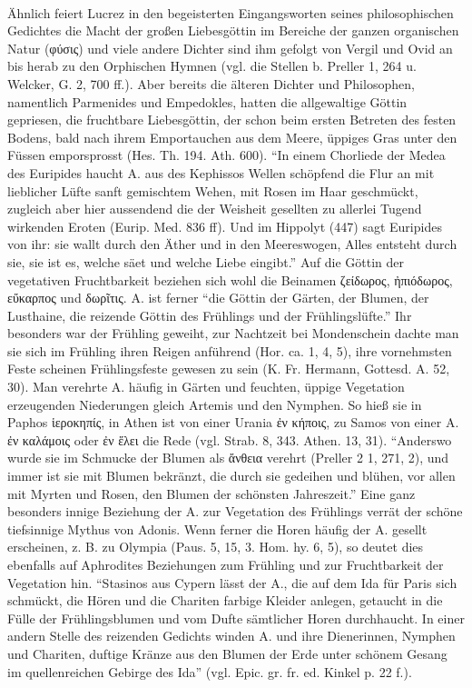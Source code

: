 \documentclass[a4paper, 11pt, oneside]{article}
\begin{document}
\paragraph{}
Ähnlich feiert Lucrez in den begeisterten Eingangsworten seines philosophischen Gedichtes die Macht der großen Liebesgöttin im Bereiche der ganzen organischen Natur (φύσις) und viele andere Dichter sind ihm gefolgt von Vergil und Ovid an bis herab zu den Orphischen Hymnen (vgl. die Stellen b. Preller 1, 264 u. Welcker, G. 2, 700 ff.). Aber bereits die älteren Dichter und Philosophen, namentlich Parmenides und Empedokles, hatten die allgewaltige Göttin gepriesen, die fruchtbare Liebesgöttin, der schon beim ersten Betreten des festen Bodens, bald nach ihrem Emportauchen aus dem Meere, üppiges Gras unter den Füssen emporsprosst (Hes. Th. 194. Ath. 600). "`In einem Chorliede der Medea des Euripides haucht A. aus des Kephissos Wellen schöpfend die Flur an mit lieblicher Lüfte sanft gemischtem Wehen, mit Rosen im Haar geschmückt, zugleich aber hier aussendend die der Weisheit gesellten zu allerlei Tugend wirkenden Eroten (Eurip. Med. 836 ff). Und im Hippolyt (447) sagt Euripides von ihr: sie wallt durch den Äther und in den Meereswogen, Alles entsteht durch sie, sie ist es, welche säet und welche Liebe eingibt."' Auf die Göttin der vegetativen Fruchtbarkeit beziehen sich wohl die Beinamen ζείδωρος, ἠπιόδωρος, εὔκαρπος und δωρῖτις. A. ist ferner "`die Göttin der Gärten, der Blumen, der Lusthaine, die reizende Göttin des Frühlings und der Frühlingslüfte."' Ihr besonders war der Frühling geweiht, zur Nachtzeit bei Mondenschein dachte man sie sich im Frühling ihren Reigen anführend (Hor. ca. 1, 4, 5), ihre vornehmsten Feste scheinen Frühlingsfeste gewesen zu sein (K. Fr. Hermann, Gottesd. A. 52, 30). Man verehrte A. häufig in Gärten und feuchten, üppige Vegetation erzeugenden Niederungen gleich Artemis und den Nymphen. So hieß sie in Paphos ἱεροκηπίς, in Athen ist von einer Urania ἐν κήποις, zu Samos von einer A. ἐν καλάμοις oder ἐν ἕλει die Rede (vgl. Strab. 8, 343. Athen. 13, 31). "`Anderswo wurde sie im Schmucke der Blumen als ἄνθεια verehrt (Preller 2 1, 271, 2), und immer ist sie mit Blumen bekränzt, die durch sie gedeihen und blühen, vor allen mit Myrten und Rosen, den Blumen der schönsten Jahreszeit."' Eine ganz besonders innige Beziehung der A. zur Vegetation des Frühlings verrät der schöne tiefsinnige Mythus von Adonis. Wenn ferner die Horen häufig der A. gesellt erscheinen, z. B. zu Olympia (Paus. 5, 15, 3. Hom. hy. 6, 5), so deutet dies ebenfalls auf Aphrodites Beziehungen zum Frühling und zur Fruchtbarkeit der Vegetation hin. "`Stasinos aus Cypern lässt der A., die auf dem Ida für Paris sich schmückt, die Hören und die Chariten farbige Kleider anlegen, getaucht in die Fülle der Frühlingsblumen und vom Dufte sämtlicher Horen durchhaucht. In einer andern Stelle des reizenden Gedichts winden A. und ihre Dienerinnen, Nymphen und Chariten, duftige Kränze aus den Blumen der Erde unter schönem Gesang im quellenreichen Gebirge des Ida"' (vgl. Epic. gr. fr. ed. Kinkel p. 22 f.).
\end{document}
